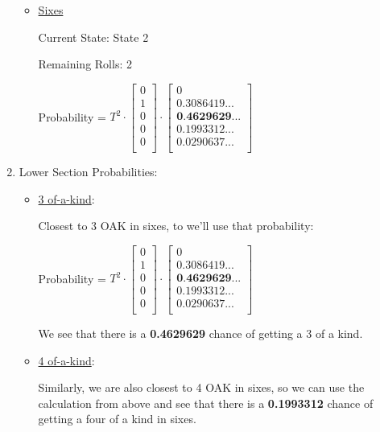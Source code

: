 \documentclass[12pt,a4paper]{article}
\begin{document}
\begin{enumerate}
\begin{itemize}
        \item \underline{Sixes}

        Current State: State 2

        Remaining Rolls: 2

        Probability = $T^2 \cdot \begin{bmatrix}
0 \\
1 \\
0 \\
0 \\
0 \\
\end{bmatrix} \cdot \begin{bmatrix}
0 \\
0.3086419... \\
\textbf{0.4629629...} \\
0.1993312... \\
0.0290637... \\
\end{bmatrix}$
    \end{itemize}

    \item Lower Section Probabilities:

    \begin{itemize}
        \item \underline{3 of-a-kind}:

        Closest to 3 OAK in sixes, to we'll use that probability:

        Probability = $T^2 \cdot \begin{bmatrix}
0 \\
1 \\
0 \\
0 \\
0 \\
\end{bmatrix} \cdot \begin{bmatrix}
0 \\
0.3086419... \\
\textbf{0.4629629...} \\
0.1993312... \\
0.0290637... \\
\end{bmatrix}$

We see that there is a \textbf{0.4629629} chance of getting a 3 of a kind.

    \item \underline{4 of-a-kind}:

    Similarly, we are also closest to 4 OAK in sixes, so we can use the calculation from above and see that there is a \textbf{0.1993312} chance of getting a four of a kind in sixes.


\end{itemize}
\end{enumerate}
\end{document}
